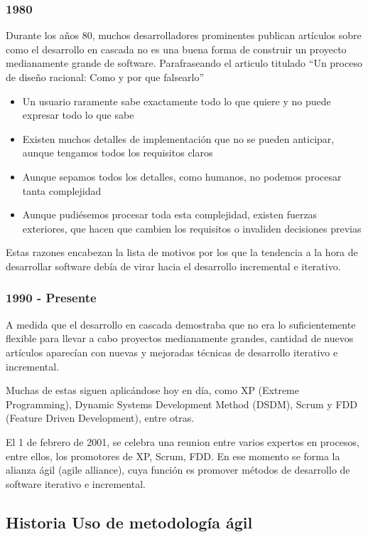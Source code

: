 \documentclass[12pt]{report} %
\begin{document}
\subsubsection{1980}

Durante los años 80, muchos desarrolladores prominentes publican artículos sobre como el desarrollo en cascada no es una buena forma de construir un proyecto medianamente grande de software.
Parafraseando el articulo titulado ``Un proceso de diseño racional: Como y por que falsearlo'' \cite{Parnas1986}
\begin{itemize}
  \item{Un usuario raramente sabe exactamente todo lo que quiere y no puede expresar todo lo que sabe}
  \item{Existen muchos detalles de implementación que no se pueden anticipar, aunque tengamos todos los requisitos claros}
  \item{Aunque sepamos todos los detalles, como humanos, no podemos procesar tanta complejidad}
  \item{Aunque pudiésemos procesar toda esta complejidad, existen fuerzas exteriores, que hacen que cambien los requisitos o invaliden decisiones previas}
\end{itemize}
Estas razones encabezan la lista de motivos por los que la tendencia a la hora de desarrollar software debía de virar hacia el desarrollo incremental e iterativo.

\subsubsection{1990 - Presente}

A medida que el desarrollo en cascada demostraba que no era lo suficientemente flexible para llevar a cabo proyectos medianamente grandes, cantidad de nuevos artículos aparecían con nuevas y mejoradas técnicas de desarrollo iterativo e incremental. \par
Muchas de estas siguen aplicándose hoy en día, como XP (Extreme Programming), Dynamic Systems Development Method (DSDM), Scrum y FDD (Feature Driven Development), entre otras. \par
El 1 de febrero de 2001, se celebra una reunion entre varios expertos en procesos, entre ellos, los promotores de XP, Scrum, FDD. 
En ese momento se forma la alianza ágil (agile alliance), cuya función es promover métodos de desarrollo de software iterativo e incremental.

\subsection{Historia Uso de metodología ágil}
\end{document}
